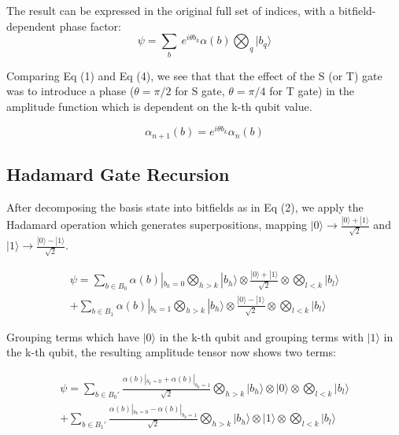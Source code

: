 \documentclass[reqno]{amsart}
\theoremstyle{definition}
\theoremstyle{remark}
\begin{document}
\noindent
The result can be expressed in the original full set of indices, with a bitfield-dependent phase factor:
\begin{equation}
\psi=\sum_b\ e^{i\theta b_k}\alpha(b)\bigotimes_{q}{} | b_q\rangle
\end{equation}

\noindent
Comparing Eq (1) and Eq (4), we see that that the effect of the S (or T) gate was to introduce a phase ($\theta=\pi/2$ for S gate, $\theta=\pi/4 $ for T gate) in the amplitude function which is  dependent on the k-th qubit value.

\begin{equation}
\alpha_{n+1}(b)=e^{i\theta b_k}\alpha_n(b)
\end{equation}
\newline

\subsection{Hadamard Gate Recursion}
\noindent
After decomposing the basis state into bitfields as in Eq (2), we apply the Hadamard operation which generates superpositions, mapping $|0\rangle \rightarrow \frac{|0\rangle + |1\rangle}{\sqrt{2}}$ and  $|1\rangle \rightarrow \frac{|0\rangle - |1\rangle}{\sqrt{2}}$. 

\begin{equation}
\begin{split}
\psi=\sum_{b \in B_0}\alpha(b)|_{b_k=0} \bigotimes_{h>k}{}|b_{h}\rangle\otimes 
\frac{|0\rangle+|1\rangle}{\sqrt{2}} \otimes\bigotimes_{l<k}|b_l\rangle \\
+ \sum_{b \in B_1}\alpha(b)|_{b_k=1} \bigotimes_{h>k}{}|b_{h}\rangle\otimes \frac{|0\rangle-|1\rangle}{\sqrt{2}}\otimes\bigotimes_{l<k}|b_l\rangle
\end{split}
\end{equation}

\noindent
Grouping terms which have $|0\rangle$ in the k-th qubit and grouping terms with $|1\rangle$ in the k-th qubit, the resulting amplitude tensor now shows two terms:

\begin{equation}
\begin{split}
\psi=\sum_{b \in B_0'}
\frac{\alpha(b)|_{b_k=0} + \alpha(b)|_{b_k=1}}{\sqrt{2}} 
\bigotimes_{h>k}{}|b_{h}\rangle
\otimes 
|0\rangle \otimes\bigotimes_{l<k}|b_l\rangle \\
+ \sum_{b \in B_1'}
\frac{\alpha(b)|_{b_k=0} - \alpha(b)|_{b_k=1}}{\sqrt{2}} 
\bigotimes_{h>k}{}|b_{h}\rangle
\otimes 
|1\rangle \otimes\bigotimes_{l<k}|b_l\rangle
\end{split}
\end{equation}
\end{document}
